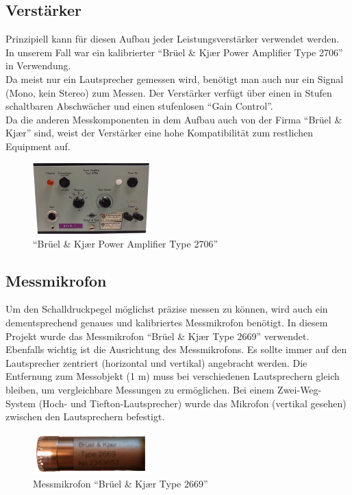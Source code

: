 \newpage
\subsection*{Verstärker}\label{subsec:4.1.3}
Prinzipiell kann für diesen Aufbau jeder Leistungsverstärker verwendet werden.
In unserem Fall war ein kalibrierter \enquote{Brüel \& Kj\ae r Power Amplifier Type 2706} in Verwendung.
\\
Da meist nur ein Lautsprecher gemessen wird, benötigt man auch nur ein Signal (Mono, kein Stereo) zum Messen.
Der Verstärker verfügt über einen in Stufen schaltbaren Abschwächer und einen stufenlosen \enquote{Gain Control}.\\
Da die anderen Messkomponenten in dem Aufbau auch von der Firma  \enquote{Brüel \& Kj\ae r} sind, weist der Verstärker eine hohe Kompatibilität zum restlichen Equipment auf.
\begin{figure} [H]
	\centering
	\includegraphics[width=0.4\textwidth]{img/LSMessung/verstaerker1V2.png}
	\caption{\enquote{Brüel \& Kj\ae r Power Amplifier Type 2706}}
	\label{fig:4.1.3.1}
\end{figure}

\subsection*{Messmikrofon}\label{subsec:4.1.4}
Um den Schalldruckpegel möglichst präzise messen zu können, wird auch ein dementsprechend genaues und kalibriertes Messmikrofon benötigt.
In diesem Projekt wurde das Messmikrofon \enquote{Brüel \& Kj\ae r Type 2669} verwendet.
\\
Ebenfalls wichtig ist die Ausrichtung des Messmikrofons.
Es sollte immer auf den Lautsprecher zentriert (horizontal und vertikal) angebracht werden.
Die Entfernung zum Messobjekt (1 m) muss bei verschiedenen Lautsprechern gleich bleiben, um vergleichbare Messungen zu ermöglichen.
Bei einem Zwei-Weg-System (Hoch- und Tiefton-Lautsprecher) wurde das Mikrofon (vertikal gesehen) zwischen den Lautsprechern befestigt.
\begin{figure} [H]
	\centering
	\includegraphics[width=0.4\textwidth]{img/LSMessung/mikroV2.png}
	\caption{Messmikrofon \enquote{Brüel \& Kj\ae r Type 2669}}
	\label{fig:4.1.4.1}
\end{figure}